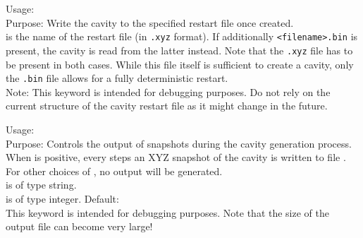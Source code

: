 {
  \noindent
  Usage:   \\[1.0ex] 
  Purpose: Write the cavity to the specified restart file
    once created. \\[1.0ex]
   is the name of the restart file (in \texttt{.xyz} format).
  If additionally \texttt{<filename>.bin} is present, the cavity is read from
  the latter instead. Note that the \texttt{.xyz} file has to be present in both
  cases. While this file itself is sufficient to create a cavity, only the
  \texttt{.bin} file allows for a fully deterministic restart.\\
}
Note: This keyword is intended for debugging purposes. 
Do not rely on the current structure of the cavity restart 
file as it might change in the future. 


{
  \noindent
  Usage:  
      \\[1.0ex] 
  Purpose: Controls the output of snapshots during the 
    cavity generation process. When  
    is positive, every  steps an XYZ snapshot 
    of the cavity is written to file . 
    For other choices of , no output will 
    be generated. \\[1.0ex]
   is of type string. \\
   is of type integer. Default:  \\
}
This keyword is intended for debugging purposes. Note that 
the size of the output file can become very large! 

